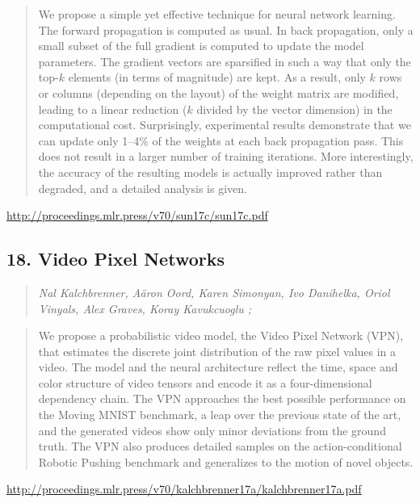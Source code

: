 \documentclass{article}
\begin{document}
\begin{quote}
    We propose a simple yet effective technique for neural network learning. The forward propagation is computed as usual. In back propagation, only a small subset of the full gradient is computed to update the model parameters. The gradient vectors are sparsified in such a way that only the top-$k$ elements (in terms of magnitude) are kept. As a result, only $k$ rows or columns (depending on the layout) of the weight matrix are modified, leading to a linear reduction ($k$ divided by the vector dimension) in the computational cost. Surprisingly, experimental results demonstrate that we can update only 1–4\% of the weights at each back propagation pass. This does not result in a larger number of training iterations. More interestingly, the accuracy of the resulting models is actually improved rather than degraded, and a detailed analysis is given.  
\end{quote}

\href{http://proceedings.mlr.press/v70/sun17c/sun17c.pdf}{http://proceedings.mlr.press/v70/sun17c/sun17c.pdf}

\subsection{18. Video Pixel Networks}

\begin{quote}
\footnotesize{\textit{Nal Kalchbrenner, Aäron Oord, Karen Simonyan, Ivo Danihelka, Oriol Vinyals, Alex Graves, Koray Kavukcuoglu ;}}

\end{quote}

\begin{quote}
    We propose a probabilistic video model, the Video Pixel Network (VPN), that estimates the discrete joint distribution of the raw pixel values in a video. The model and the neural architecture reflect the time, space and color structure of video tensors and encode it as a four-dimensional dependency chain. The VPN approaches the best possible performance on the Moving MNIST benchmark, a leap over the previous state of the art, and the generated videos show only minor deviations from the ground truth. The VPN also produces detailed samples on the action-conditional Robotic Pushing benchmark and generalizes to the motion of novel objects.  
\end{quote}

\href{http://proceedings.mlr.press/v70/kalchbrenner17a/kalchbrenner17a.pdf}{http://proceedings.mlr.press/v70/kalchbrenner17a/kalchbrenner17a.pdf}
\end{document}
